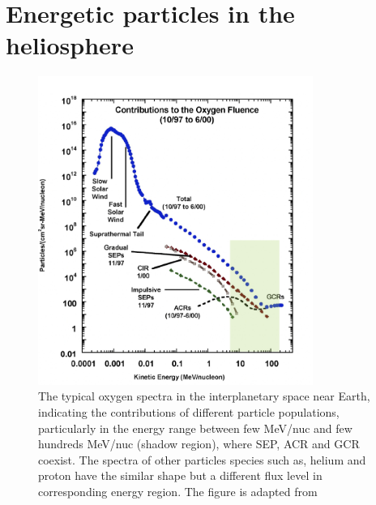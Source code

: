 \section{Energetic particles in the heliosphere}
\label{sec:particles_heliosphere}

\begin{figure}
	\centering
	\includegraphics[width = 0.8\textwidth]{images/heliospheric_particle_spectra_color.png}
	\caption[Energy spectra of oxygen ions in near-Earth space]{The typical oxygen spectra in the interplanetary space near Earth, indicating the contributions of different particle populations, particularly in the energy range between few MeV/nuc and few hundreds MeV/nuc (shadow region), where \acs{SEP}, \acs{ACR} and \acs{GCR} coexist. The spectra of other particles species such as, helium and proton have the similar shape but a different flux level in corresponding energy region. The figure is adapted from \citep{Mewaldt-2001}}
	\label{Fig:Oxygen_spectra_heliosphere}
\end{figure}


